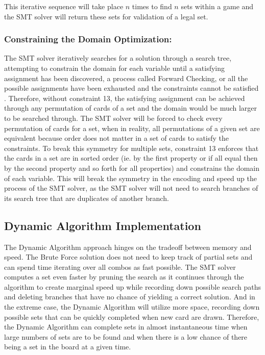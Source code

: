 \documentclass[pageno]{jpaper}
\begin{document}
This iterative sequence will take place $n$ times to find $n$ sets within a game and the SMT solver will return these sets for validation of a legal set. 

\subsubsection{Constraining the Domain Optimization:}

The SMT solver iteratively searches for a solution through a search tree, attempting to constrain the domain for each variable until a satisfying assignment has been discovered, a process called Forward Checking, or all the possible assignments have been exhausted and the constraints cannot be satisfied  \cite{search_from_AI}. Therefore, without constraint 13, the satisfying assignment can be achieved through any permutation of cards of a set and the domain would be much larger to be searched through. The SMT solver will be forced to check every permutation of cards for a set, when in reality, all permutations of a given set are equivalent because order does not matter in a set of cards to satisfy the constraints. To break this symmetry for multiple sets, constraint 13 enforces that the cards in a set are in sorted order (ie. by the first property or if all equal then by the second property and so forth for all properties) and constrains the domain of each variable. This will break the symmetry in the encoding and speed up the process of the SMT solver, as the SMT solver will not need to search branches of its search tree that are duplicates of another branch. 

\subsection{Dynamic Algorithm Implementation}


The Dynamic Algorithm approach hinges on the tradeoff between memory and speed. The Brute Force solution does not need to keep track of partial sets and can spend time iterating over all combos as fast possible. The SMT solver computes a set even faster by pruning the search as it continues through the algorithm to create marginal speed up while recording down possible search paths and deleting branches that have no chance of yielding a correct solution. And in the extreme case, the Dynamic Algorithm will utilize more space, recording down possible sets that can be quickly completed when new card are drawn. Therefore, the Dynamic Algorithm can complete sets in almost instantaneous time when large numbers of sets are to be found and when there is a low chance of there being a set in the board at a given time. 
\end{document}
